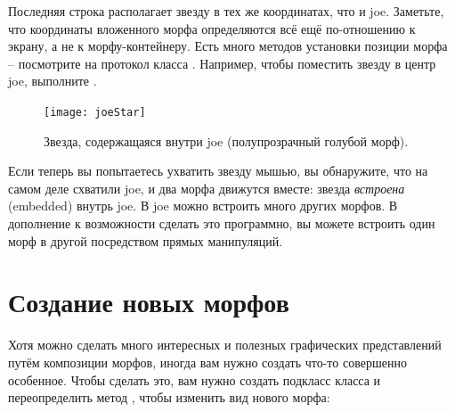 \documentclass[a4paper,10pt,twoside]{book}
\begin{document}
\noindent
Последняя строка располагает звезду в тех же координатах, что и joe.
Заметьте, что координаты вложенного морфа определяются всё ещё по-отношению к экрану, а не к морфу-контейнеру.
Есть много методов установки позиции морфа -- посмотрите на протокол  класса .
Например,
чтобы поместить звезду в центр joe, выполните   .

\begin{figure}[ht]
	\centerline{\texttt{[image: joeStar]}}
	\caption{Звезда, содержащаяся внутри joe (полупрозрачный голубой морф). 
		}
\end{figure}

Если теперь вы попытаетесь ухватить звезду мышью, вы обнаружите, что на самом деле схватили joe, и два морфа движутся вместе: звезда \emph{встроена} (embedded) внутрь joe.
В joe можно встроить много других морфов.
В дополнение к возможности сделать это программно, вы можете встроить один морф в другой посредством прямых манипуляций.

\section{Создание новых морфов}

Хотя можно сделать много интересных и полезных графических представлений путём композиции морфов, иногда вам нужно создать что-то совершенно особенное.
Чтобы сделать это, вам нужно создать подкласс класса  и переопределить метод , чтобы изменить вид нового морфа:
\end{document}
